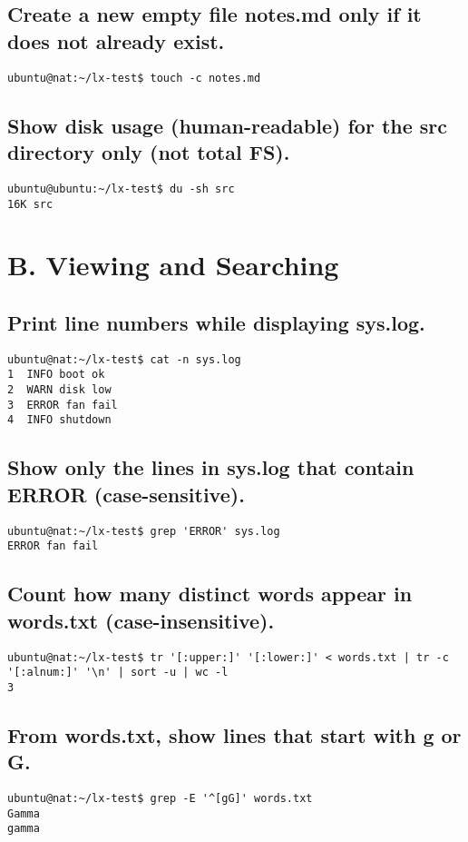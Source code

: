 \subsection{ Create a new empty file notes.md only if it does not already exist.}
\begin{verbatim}
ubuntu@nat:~/lx-test$ touch -c notes.md
\end{verbatim}

\subsection{Show disk usage (human-readable) for the src directory only (not total FS).}
\begin{verbatim}
ubuntu@ubuntu:~/lx-test$ du -sh src
16K	src
\end{verbatim}

\section{B. Viewing and Searching}
\subsection{Print line numbers while displaying sys.log.}
\begin{verbatim}
ubuntu@nat:~/lx-test$ cat -n sys.log
1  INFO boot ok
2  WARN disk low
3  ERROR fan fail
4  INFO shutdown
\end{verbatim}

\subsection{Show only the lines in sys.log that contain ERROR (case-sensitive).}
\begin{verbatim}
ubuntu@nat:~/lx-test$ grep 'ERROR' sys.log
ERROR fan fail
\end{verbatim}

\subsection{Count how many distinct words appear in words.txt (case-insensitive).}
\begin{verbatim}
ubuntu@nat:~/lx-test$ tr '[:upper:]' '[:lower:]' < words.txt | tr -c '[:alnum:]' '\n' | sort -u | wc -l
3
\end{verbatim}

\subsection{From words.txt, show lines that start with g or G.}
\begin{verbatim}
ubuntu@nat:~/lx-test$ grep -E '^[gG]' words.txt
Gamma
gamma
\end{verbatim}

